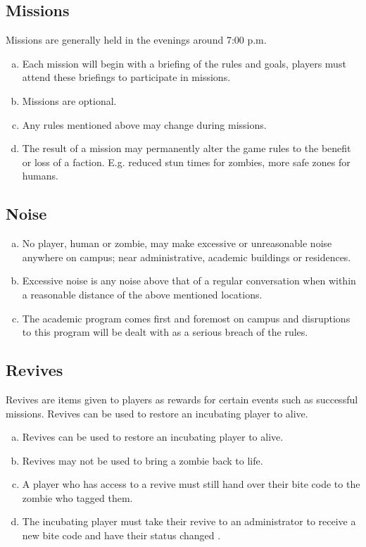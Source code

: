 \documentclass[a4paper,12pt]{article}
\begin{document}
\subsection{Missions}
Missions are generally held in the evenings around 7:00 p.m.
\begin{enumerate}[(a)]
	\item Each mission will begin with a briefing of the rules and goals, players must attend these briefings to participate in missions.
	\item Missions are optional.
	\item Any rules mentioned above may change during missions.
	\item The result of a mission may permanently alter the game rules to the benefit or loss of a faction. E.g. reduced stun times for zombies, more safe zones for humans.
\end{enumerate}

\subsection{Noise}
\begin{enumerate}[(a)]
	\item No player, human or zombie, may make excessive or unreasonable noise anywhere on campus; near administrative, academic buildings or residences.
	\item Excessive noise is any noise above that of a regular conversation when within a reasonable distance of the above mentioned locations.
    \item The academic program comes first and foremost on campus and disruptions to this program will be dealt with as a serious breach of the rules.
\end{enumerate}

\subsection{Revives}
Revives are items given to players as rewards for certain events such as successful missions. Revives can be used to restore an incubating player to alive.
\begin{enumerate}[(a)]
	\item Revives can be used to restore an incubating player to alive.
	\item Revives may not be used to bring a zombie back to life.
	\item A player who has access to a revive must still hand over their bite code to the zombie who tagged them.
	\item The incubating player must take their revive to an administrator to receive a new bite code and have their status changed .

\end{enumerate}
\end{document}
